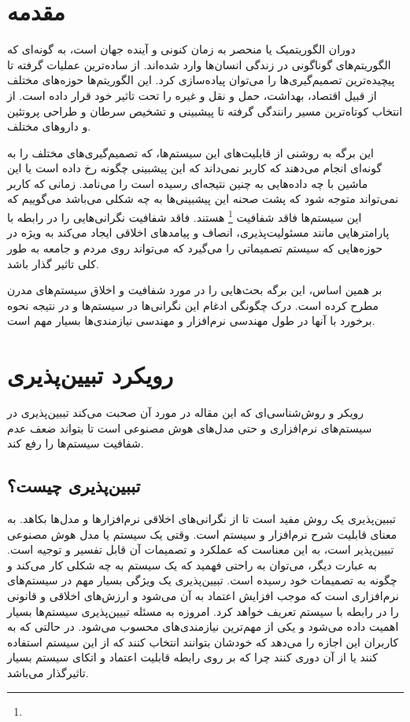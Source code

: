 \section{مقدمه}

دوران الگوریتمیک یا  منحصر به زمان کنونی و آینده جهان است،
به گونه‌ای که الگوریتم‌های گوناگونی در زندگی انسان‌ها وارد شده‌اند. از ساده‌ترین
عملیات گرفته تا پیچیده‌ترین تصمیم‌گیری‌ها را می‌توان پیاده‌سازی کرد. این
الگوریتم‌ها حوزه‌های مختلف از قبیل اقتصاد، بهداشت، حمل و نقل و غیره را تحت تاثیر
خود قرار داده است. از انتخاب کوتاه‌ترین مسیر رانندگی گرفته تا پیشبینی و تشخیص
سرطان و طراحی پروتئین و دارو‌های مختلف.

این برگه به روشنی از قابلیت‌های این سیستم‌ها، که تصمیم‌گیری‌های مختلف را به
گونه‌ای انجام می‌دهند که کاربر نمی‌داند که این پیشبینی چگونه رخ داده است یا این
ماشین با چه داده‌هایی به چنین نتیجه‌ای رسیده است را 
می‌نامد. زمانی که کاربر نمی‌تواند متوجه شود که پشت صحنه این پیشبینی‌ها به چه
شکلی می‌باشد می‌گوییم که این سیستم‌ها فاقد شفافیت \footnote{}
هستند. فاقد شفافیت نگرانی‌هایی را در رابطه با پارامتر‌هایی مانند مسئولیت‌پذیری،
انصاف و پیامد‌های اخلاقی ایجاد می‌کند به ویژه در حوزه‌هایی که سیستم تصمیماتی را
می‌گیرد که می‌تواند روی مردم و جامعه به طور کلی تاثیر گذار باشد.

بر همین اساس، این برگه بحث‌هایی را در مورد شفافیت و اخلاق سیستم‌های مدرن مطرح
کرده است. درک چگونگی ادغام این نگرانی‌ها در سیستم‌ها و در نتیجه نحوه برخورد با
آنها در طول مهندسی نرم‌افزار و مهندسی نیازمندی‌ها بسیار مهم است.

\section{رویکرد تبیین‌پذیری}

رویکر و روش‌شناسی‌ای که این مقاله در مورد آن صحبت می‌کند تببین‌پذیری در
سیستم‌های نرم‌افزاری و حتی مدل‌های هوش مصنوعی است تا بتواند ضعف عدم شفافیت
سیستم‌ها را رفع کند.

\subsection{تببین‌پذیری چیست؟}

تببین‌پذیری یک روش مفید است تا از نگرانی‌های اخلاقی نرم‌افزار‌ها و مدل‌ها بکاهد.
به معنای قابلیت شرح نرم‌افزار و سیستم است. وقتی یک سیستم یا مدل هوش مصنوعی
تبیین‌پذیر است، به این معناست که عملکرد و تصمیمات آن قابل تفسیر و توجیه است. به
عبارت دیگر، می‌توان به راحتی فهمید که یک سیستم به چه شکلی کار می‌کند و چگونه به
تصمیمات خود رسیده است. تبیین‌پذیری یک ویژگی بسیار مهم در سیستم‌های نرم‌افزاری
است که موجب افزایش اعتماد به آن می‌شود و ارزش‌های اخلاقی و قانونی را در رابطه با
سیستم تعریف خواهد کرد. امروزه به مسئله تبیین‌پذیری سیستم‌ها بسیار اهمیت داده
می‌شود و یکی از مهم‌ترین نیازمندی‌های  محسوب می‌شود. در حالتی
که به کاربران این اجازه را می‌دهد که خودشان بتوانند انتخاب کنند که از این سیستم
استفاده کنند یا از آن دوری کنند چرا که بر روی رابطه قابلیت اعتماد و اتکای سیستم
بسیار تاثیرگذار می‌باشد.

